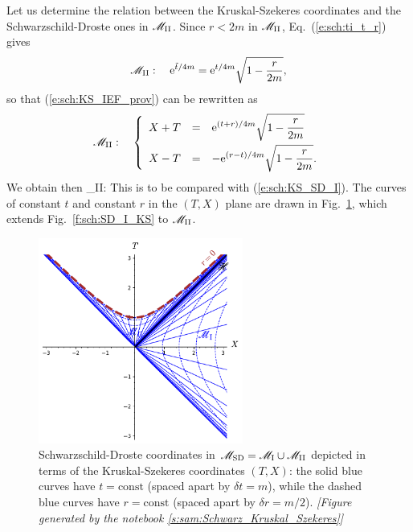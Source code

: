Let us determine the relation between the Kruskal-Szekeres coordinates and
the Schwarz\-schild-Droste ones in $\mathscr{M}_{\rm II}$. Since $r<2m$ in $\mathscr{M}_{\rm II}$,
Eq.~(\ref{e:sch:ti_t_r}) gives
\[
    \mathscr{M}_{\rm II}: \quad  \mathrm{e}^{{\tilde t}/4m} = \mathrm{e}^{t/4m}  \sqrt{1 -  \frac{r}{2m} } ,
\]
so that (\ref{e:sch:KS_IEF_prov}) can be rewritten as
\[
     \mathscr{M}_{\rm II}: \quad
\left\{\begin{array}{lcl}
    X+T & = & \displaystyle \mathrm{e}^{(t+r)/4m} \sqrt{1 -  \frac{r}{2m} }  \\[2ex]
    X-T & = & \displaystyle  - \mathrm{e}^{(r -t)/4m}  \sqrt{1 -  \frac{r}{2m} }.
    \end{array}\right.
\]
We obtain then
\be \label{e:sch:KS_SD_II}
    \M_{\rm II}: \quad {}
    \iff
\ee
This is to be compared with (\ref{e:sch:KS_SD_I}).
The curves of constant $t$ and constant $r$ in the $(T,X)$ plane
are drawn in Fig.~\ref{f:sch:SD_KS}, which extends Fig.~\ref{f:sch:SD_I_KS}
to $\mathscr{M}_{\rm II}$.

\begin{figure}
\centerline{\includegraphics[width=0.6\textwidth]{max_SD_KS.pdf}}
\caption[]{\label{f:sch:SD_KS} \footnotesize
Schwarzschild-Droste coordinates in $\mathscr{M}_{\rm SD} = \mathscr{M}_{\rm I}\cup \mathscr{M}_{\rm II}$
depicted in terms of the Kruskal-Szekeres coordinates $(T,X)$: the solid blue
curves have $t=\mathrm{const}$ (spaced apart by $\delta t = m$), while the
dashed blue curves have $r=\mathrm{const}$ (spaced apart by $\delta r = m/2$).
\textsl{[Figure generated by the notebook \ref{s:sam:Schwarz_Kruskal_Szekeres}]}
}
\end{figure}


